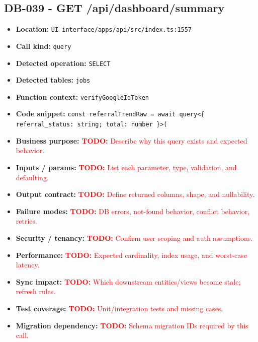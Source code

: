 \documentclass[11pt]{article}
\newcommand{\todoitem}[1]{\textcolor{red}{\textbf{TODO:} #1}}
\begin{document}
\subsection{DB-039 - GET /api/dashboard/summary}
\begin{itemize}[leftmargin=1.5em]
\item \textbf{Location:} \texttt{UI interface/apps/api/src/index.ts:1557}
\item \textbf{Call kind:} \texttt{query}
\item \textbf{Detected operation:} \texttt{SELECT}
\item \textbf{Detected tables:} \texttt{jobs}
\item \textbf{Function context:} \texttt{verifyGoogleIdToken}
\item \textbf{Code snippet:} \texttt{const referralTrendRaw = await query<\{ referral\_status: string; total: number \}>(}
\item \textbf{Business purpose:} \todoitem{Describe why this query exists and expected behavior.}
\item \textbf{Inputs / params:} \todoitem{List each parameter, type, validation, and defaulting.}
\item \textbf{Output contract:} \todoitem{Define returned columns, shape, and nullability.}
\item \textbf{Failure modes:} \todoitem{DB errors, not-found behavior, conflict behavior, retries.}
\item \textbf{Security / tenancy:} \todoitem{Confirm user scoping and auth assumptions.}
\item \textbf{Performance:} \todoitem{Expected cardinality, index usage, and worst-case latency.}
\item \textbf{Sync impact:} \todoitem{Which downstream entities/views become stale; refresh rules.}
\item \textbf{Test coverage:} \todoitem{Unit/integration tests and missing cases.}
\item \textbf{Migration dependency:} \todoitem{Schema migration IDs required by this call.}
\end{itemize}
\end{document}
